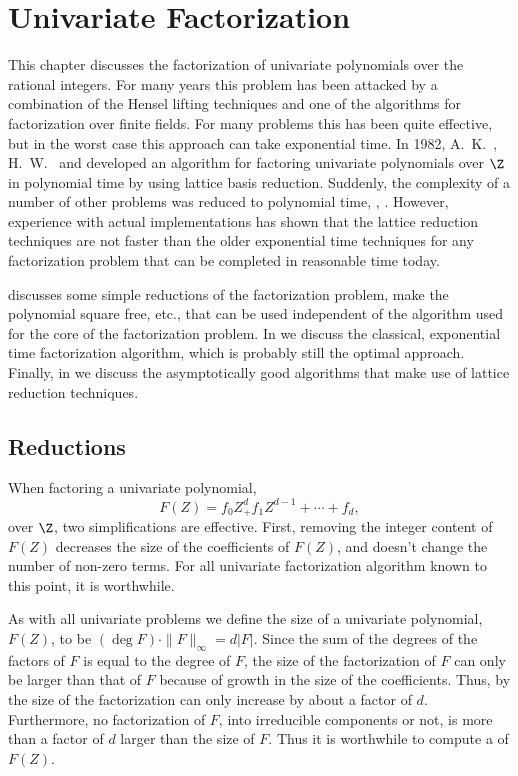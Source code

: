 \chapter{Univariate Factorization}
\label{UFactoring:Chap}

This chapter discusses the factorization of univariate polynomials
over the rational integers.  For many years this problem has been
attacked by a combination of the Hensel lifting techniques and one of
the algorithms for factorization over finite fields.  For many
problems this has been quite effective, but in the worst case this
approach can take exponential time.  In 1982, A.~K.~{\LenstraA},
H.~W.~{\LenstraH} and {\Lovasz} \cite{LenstraAK82} developed an
algorithm for factoring univariate polynomials over $\Z$ in polynomial
time by using lattice basis reduction.  Suddenly, the complexity of a
number of other problems was reduced to polynomial time, \eg,
\cite{Landau85a}.  However, experience with actual implementations has
shown that the lattice reduction
techniques are not faster than the older exponential time techniques
for any factorization problem that can be completed in reasonable time
today.

 discusses some simple reductions of the
factorization problem, make the polynomial square free, etc., that can
be used independent of the algorithm used for the core of the
factorization problem.  In  we discuss the
classical, exponential time factorization algorithm, which is probably
still the optimal approach.  Finally, in  we
discuss the asymptotically good algorithms that make use of lattice
reduction techniques. 

\section{Reductions}
\label{UF:Reductions:Sec}

When factoring a univariate polynomial, 
\[
F(Z) = f_0 Z^d _+ f_1 Z^{d-1} + \cdots + f_d,
\]
over $\Z$, two simplifications are effective.  First, removing the
integer content of $F(Z)$ decreases the size of the coefficients of
$F(Z)$, and doesn't change the number of non-zero terms.  For all
univariate factorization algorithm known to this point, it is
worthwhile.

As with all univariate problems we define the size of a univariate
polynomial, $F(Z)$, to be $(\deg F)\cdot \|F\|_{\infty} = d
|F|$. Since the sum of the
degrees of the factors of $F$ is equal to the degree of $F$, the size
of the factorization of $F$ can only be larger than that of $F$
because of growth in the size of the coefficients.  Thus, by
 the size of the factorization can
only increase by about a factor of $d$.  Furthermore, no factorization
of $F$, into irreducible components or not, is more than a factor of
$d$ larger than the size of $F$.  Thus it is worthwhile to compute a
 of $F(Z)$.

